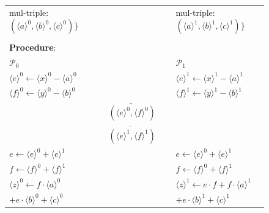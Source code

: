 \documentclass[letterpaper]{article} %
\begin{document}
\begin{figure}
{\begin{tabular}{lcl}
            mul-triple:$ 
            (\langle a\rangle ^{0},\langle b\rangle ^{0},\langle c\rangle ^{0})\}$
            &
            &
            mul-triple:$ (\langle a\rangle ^{1},\langle b\rangle ^{1},\langle c\rangle ^{1})\}$
            \\
            \\
            \textbf{Procedure}:\\
            $\mathcal{P}_{0}$ &  &  $\mathcal{P}_{1}$ \\
            $\langle e\rangle ^{0}\leftarrow\langle x\rangle ^{0}-\langle a\rangle ^{0}$ 
            &
            &
            $\langle e\rangle ^{1}\leftarrow\langle x\rangle ^{1}-\langle a\rangle ^{1}$ 
            \\
            $\langle f\rangle ^{0}\leftarrow\langle y\rangle ^{0}-\langle b\rangle ^{0}$
            &
            &
            $\langle f\rangle ^{1}\leftarrow\langle y\rangle ^{1}-\langle b\rangle ^{1}$
            \\
            & $\underrightarrow{~~~~~~(\langle e\rangle ^{0},\langle f\rangle ^{0})~~~~~~}$ &\\
            & $\underleftarrow{~~~~~~(\langle e\rangle ^{1},\langle f\rangle ^{1})~~~~~~}$ &\\
            $e\leftarrow\langle e\rangle ^{0}+\langle e\rangle ^{1}$& &$e\leftarrow\langle e\rangle ^{0}+\langle e\rangle ^{1}$\\
            $f\leftarrow\langle f\rangle ^{0}+\langle f\rangle ^{1}$& &$f\leftarrow\langle f\rangle ^{0}+\langle f\rangle ^{1}$\\
            $\langle z\rangle^{0}\leftarrow f\cdot \langle a\rangle^{0}$
            & &
            $\langle z\rangle^{1}\leftarrow e \cdot f + f\cdot \langle a\rangle^{1}$\\
            $+e \cdot \langle b\rangle^{0} + \langle c\rangle^{0}$& &$+e \cdot \langle b\rangle^{1} + \langle c\rangle^{1}$\\
            \hline
    
    
    
    
        \end{tabular}}
    
    \end{figure}
    
\end{document}
